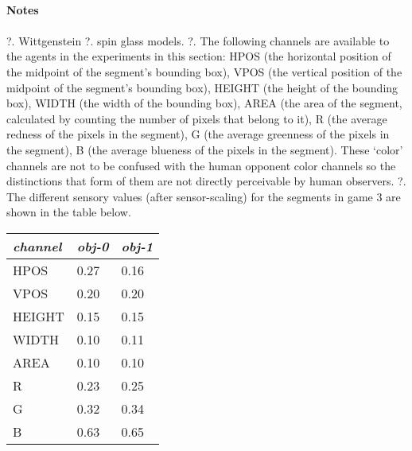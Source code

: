
\bigskip
\paragraph{\bf Notes}
\paragraph{}
\footnotesize
\vspace{0.2cm}
\newline
\hspace{-0.5cm}
?. Wittgenstein
\vspace{0.2cm}
\newline
\hspace{-0.5cm}
?. spin glass models. 
\vspace{0.2cm}
\newline
\hspace{-0.5cm}
?. The following channels are available to the agents 
in the experiments in this section: 
HPOS (the horizontal position of the midpoint 
of the segment's bounding box), 
VPOS (the vertical position of the midpoint of the segment's 
bounding box), HEIGHT (the height of the bounding box), 
WIDTH (the width of the bounding box), AREA
(the area of the segment, calculated
by counting the number of pixels that belong to it), 
R (the average redness of the pixels in the segment), 
G (the average greenness of the pixels in the segment), 
B (the average blueness of the pixels in the segment). 
These `color' channels are not to be confused with the 
human opponent color channels so the distinctions 
that form of them are not directly perceivable by 
human observers. 
\vspace{0.2cm}
\newline
\hspace{-0.5cm}
?. The different sensory values (after sensor-scaling)
for the segments in game 3 are shown in the table below. 
\begin{center}
\begin{tabular}{ l  l  l } \hline
{\it channel}& {\it obj-0} & {\it obj-1}\\ \hline
HPOS & 0.27 & 0.16\\ \hline
VPOS & 0.20 & 0.20\\ \hline
HEIGHT & 0.15 & 0.15\\ \hline
WIDTH & 0.10 & 0.11\\ \hline
AREA & 0.10 & 0.10\\ \hline
R & 0.23 & 0.25\\ \hline
G & 0.32 & 0.34\\ \hline
B & 0.63 & 0.65\\ \hline
\end{tabular}
\end{center}
